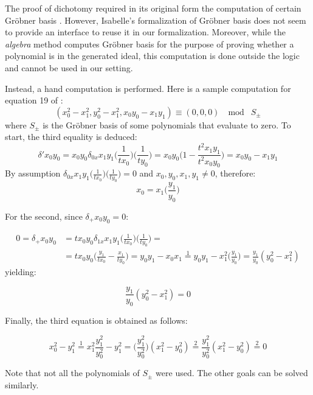 \documentclass{llncs}
\begin{document}
The proof of dichotomy required in its original form the computation
of certain Gr\"{o}bner basis \cite{hales2016group}. However,
Isabelle's formalization of Gr\"{o}bner basis
\cite{maletzky2018grobner} does not seem to provide an interface to
reuse it in our formalization. Moreover, while the \textit{algebra}
method computes Gr\"{o}bner basis for the purpose of proving whether a
polynomial is in the generated ideal, this computation is done outside
the logic and cannot be used in our setting.

Instead, a hand computation is performed. Here is a sample computation
for equation 19 of \cite{hales2016group}:
\[
(x_0^2 - x_1^2,y_0^2 -
x_1^2,x_0y_0 - x_1 y_1) \equiv (0,0,0) \; \mod \; S_{\pm}
\]
where
$S_{\pm}$ is the Gr\"{o}bner basis of some polynomials that evaluate
to zero. To start, the third equality is deduced:
\[
\delta' x_0 y_0 =
x_0 y_0 \delta_{0x} x_1 y_1 \Big(\frac{1}{t x_0}\Big) \Big(\frac{1}{t
  y_0}\Big) = x_0 y_0 \Big(1 - \frac{t^2 x_1 y_1}{t^2 x_0 y_0}\Big) =
x_0y_0 - x_1 y_1
\]
By assumption $\delta_{0x} x_1 y_1 \Big(\frac{1}{t
  x_0}\Big) \Big(\frac{1}{t y_0}\Big) = 0$ and $x_0,y_0,x_1,y_1 \neq
0$, therefore:
\begin{equation}\label{eqn:1}
x_0 = x_1 \Big(\frac{y_1}{y_0}\Big)
\end{equation}

For the second, since $\delta_{+} x_0 y_0 = 0$: 

\begin{align*}
  0 = \delta_{+} x_0 y_0 &= t x_0 y_0
  \delta_{1x} x_1 y_1 \Big(\frac{1}{tx_0}\Big) \Big(\frac{1}{ty_0}\Big) =\\
  &= t x_0 y_0 \Big(\frac{y_1}{t x_0} - \frac{x_1}{t y_0}\Big) =
  y_0 y_1 - x_0 x_1 
  \stackrel{1}{=} y_0 y_1 - x_1^2 \Big(\frac{y_1}{y_0}\Big) =
  \frac{y_1}{y_0} (y_0^2 - x_1^2)
\end{align*} yielding:

\begin{equation}\label{eqn:2}
\frac{y_1}{y_0} (y_0^2 - x_1^2) = 0
\end{equation}

Finally, the third equation is obtained as follows:

\[
x_0^2 - y_1^2 \stackrel{1}{=} x_1^2 \frac{y_1^2}{y_0^2} - y_1^2 =
\Big(\frac{y_1^2}{y_0^2}\Big) (x_1^2 - y_0^2) \stackrel{2}{=}
\frac{y_1^2}{y_0^2} (x_1^2 - y_0^2) \stackrel{2}{=} 0
\]

Note that not all the polynomials of $S_{\pm}$ were used. The other
goals can be solved similarly.
\end{document}

